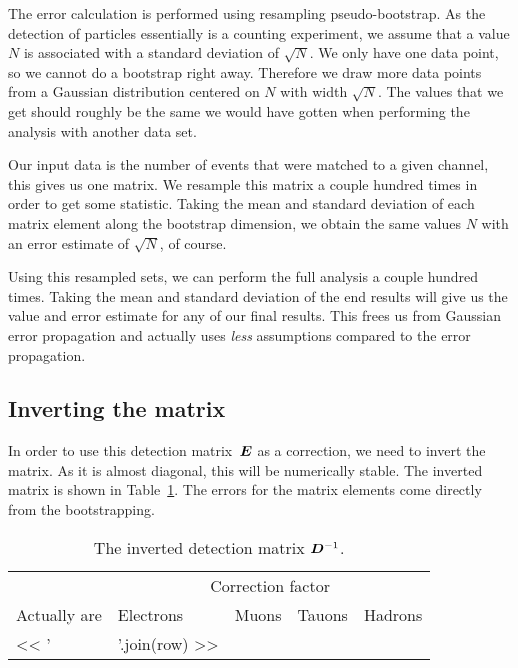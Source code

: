 \documentclass[11pt, english, fleqn, DIV=15, headinclude, BCOR=2cm]{scrreprt}
\begin{document}
The error calculation is performed using resampling pseudo-bootstrap. As the
detection of particles essentially is a counting experiment, we assume that a
value $N$ is associated with a standard deviation of $\sqrt N$. We only have
one data point, so we cannot do a bootstrap right away. Therefore we draw more
data points from a Gaussian distribution centered on $N$ with width $\sqrt N$.
The values that we get should roughly be the same we would have gotten when
performing the analysis with another data set.

Our input data is the number of events that were matched to a given channel,
this gives us one matrix. We resample this matrix a couple hundred times in
order to get some statistic. Taking the mean and standard deviation of each
matrix element along the bootstrap dimension, we obtain the same values $N$
with an error estimate of $\sqrt N$, of course.

Using this resampled sets, we can perform the full analysis a couple hundred
times. Taking the mean and standard deviation of the end results will give us
the value and error estimate for any of our final results. This frees us from
Gaussian error propagation and actually uses \emph{less} assumptions compared
to the error propagation.

\subsection{Inverting the matrix}

In order to use this detection matrix~$\mat E$ as a correction, we need to
invert the matrix. As it is almost diagonal, this will be numerically stable.
The inverted matrix is shown in Table~\ref{tab:inverted}. The errors for the
matrix elements come directly from the bootstrapping.

\begin{table}
    \centering
    \begin{tabular}{lllll}
        \toprule
        & \multicolumn{4}{c}{Correction factor} \\
        \cmidrule(l){2-5}
        {Actually are}
        & {Electrons}
        & {Muons}
        & {Tauons}
        & {Hadrons} \\
        \midrule
        << ' & '.join(row) >> \\
        \bottomrule
    \end{tabular}
    \caption{%
        The inverted detection matrix $\mat D\inv$.
    }
    \label{tab:inverted}
\end{table}
\end{document}
